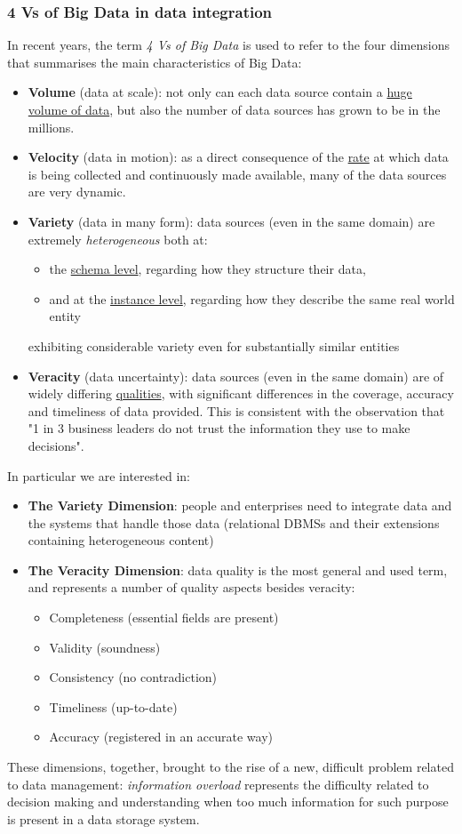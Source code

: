 \documentclass[10pt,a4paper]{article}
\begin{document}
\subsubsection{4 Vs of Big Data in data integration}
\begin{justify}
In recent years, the term \textit{4 Vs of Big Data} is used to refer to the four dimensions that summarises the main characteristics of Big Data:
\begin{itemize}
	\item \textbf{Volume} (data at scale): not only can each data source contain a \uline{huge volume of data}, but also the number of data sources has grown to be in the millions.
	\item \textbf{Velocity} (data in motion): as a direct consequence of the \uline{rate} at which data is being collected and continuously made available, many of the data sources are very dynamic.
	\item \textbf{Variety} (data in many form): data sources (even in the same domain) are extremely \textit{heterogeneous} both at:
	\begin{itemize}
		\item the \uline{schema level}, regarding how they structure their data, 
		\item and at the \uline{instance level}, regarding how they describe the same real world entity
\end{itemize}
exhibiting considerable variety even for substantially similar entities
	\item \textbf{Veracity} (data uncertainty): data sources (even in the same domain) are of widely differing \uline{qualities}, with significant differences in the coverage, accuracy and timeliness of data provided. This is consistent with the observation that "1 in 3 business leaders do not trust the information they use to make decisions".
\end{itemize}
In particular we are interested in:
\begin{itemize}
	\item \textbf{The Variety Dimension}: people and enterprises need to integrate data and the systems that handle those data (relational DBMSs and their extensions containing heterogeneous content)
	\item \textbf{The Veracity Dimension}: data quality is the most general and used term, and represents a number of quality aspects besides veracity:
	\begin{itemize}
		\item Completeness (essential fields are present)
		\item Validity (soundness)
		\item Consistency (no contradiction)
		\item Timeliness (up-to-date)
		\item Accuracy (registered in an accurate way)
	\end{itemize}
\end{itemize}
These dimensions, together, brought to the rise of a new, difficult problem related to data management: \textit{information overload} represents the difficulty related to decision making and understanding when too much information for such purpose is present in a data storage system. 
\end{justify}
\end{document}

